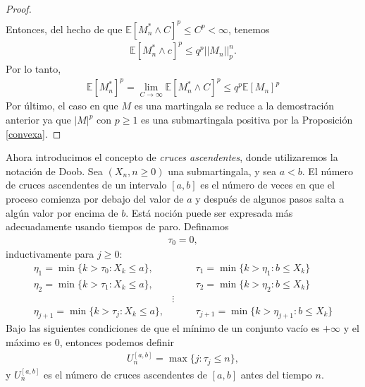 \begin{proof}
\begin{align*}
	\end{align*}
Entonces, del hecho de que $\mathbb{E}[M_n^{*} \wedge C]^p \leq C^p < \infty$, tenemos
	\begin{align*}
		\mathbb{E}[M_n^{*} \wedge c]^p \leq q^p ||M_n||_p^n.
	\end{align*}
Por lo tanto, 
	\begin{align*}
		\mathbb{E}[M_n^{*}]^p = \lim_{C \rightarrow \infty} \mathbb{E}[M_n^{*} \wedge C]^p \leq q^p\mathbb{E}[M_n]^p
	\end{align*}
Por último, el caso en que $M$ es una martingala se reduce a la demostración anterior ya que $|M|^p$ con $p \geq 1$ es una submartingala positiva por la Proposición \ref{convexa}.
\end{proof}

Ahora introducimos el concepto de \emph{cruces ascendentes}, donde utilizaremos la notación de Doob. Sea $(X_n, n \geq 0)$ una submartingala, y sea $a < b$. El número de cruces ascendentes de un intervalo $[a, b]$ es el número de veces en que el proceso comienza por debajo del valor de $a$ y después de algunos pasos salta a algún valor por encima de $b$. Está noción puede ser expresada más adecuadamente usando tiempos de paro. Definamos
\begin{align*}
	\tau_0 = 0,
\end{align*}
inductivamente para $j \geq 0$:
	\begin{align*}
		\eta_{1} = \min \{k > \tau_0 : X_k \leq a \}, & \hspace{1cm} \tau_{1} = \min \{k > \eta_{1} : b \leq X_k \} \\
		\eta_{2} = \min \{k > \tau_1 : X_k \leq a \}, & \hspace{1cm} \tau_{2} = \min \{k > \eta_{2} : b \leq X_k \} \\
		& \vdots \\
		\eta_{j+1} = \min \{k > \tau_j : X_k \leq a \}, & \hspace{1cm} \tau_{j+1} = \min \{k > \eta_{j+1} : b \leq X_k \}
	\end{align*}
Bajo las siguientes condiciones de que el mínimo de un conjunto vacío es $+ \infty$ y el máximo es $0$, entonces podemos definir
	\begin{align}
		U_n^{[a, b]} = \max \{j : \tau_j \leq n\}, \label{aan}
	\end{align}
y $U_n^{[a, b]}$ es el número de cruces ascendentes de $[a, b]$ antes del tiempo $n$.

